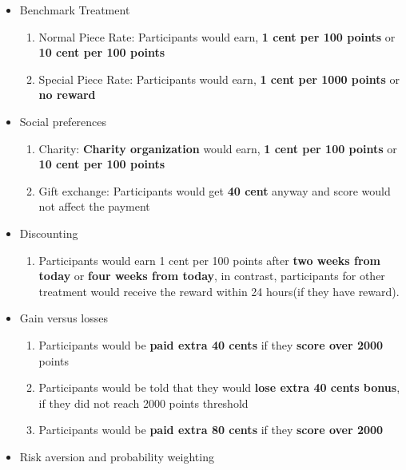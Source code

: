 \documentclass[11pt
]{article}
\begin{document}
\begin{itemize}
\item
  Benchmark Treatment

  \begin{enumerate}
  \def\labelenumi{\arabic{enumi}.}
  \item
    Normal Piece Rate: Participants would earn, \textbf{1 cent per 100
    points} or \textbf{10 cent per 100 points}
  \item
    Special Piece Rate: Participants would earn, \textbf{1 cent per 1000
    points} or \textbf{no reward}
  \end{enumerate}
\item
  Social preferences

  \begin{enumerate}
  \def\labelenumi{\arabic{enumi}.}
  \item
    Charity: \textbf{Charity organization} would earn, \textbf{1 cent
    per 100 points} or \textbf{10 cent per 100 points}
  \item
    Gift exchange: Participants would get \textbf{40 cent} anyway and
    score would not affect the payment
  \end{enumerate}
\item
  Discounting

  \begin{enumerate}
  \def\labelenumi{\arabic{enumi}.}
  \item
    Participants would earn 1 cent per 100 points after \textbf{two weeks
    from today} or \textbf{four weeks from today}, in contrast,
    participants for other treatment would receive the reward within 24
    hours(if they have reward).
  \end{enumerate}
\item
  Gain versus losses

  \begin{enumerate}
  \def\labelenumi{\arabic{enumi}.}
  \item
    Participants would be \textbf{paid extra 40 cents} if they
    \textbf{score over 2000} points
  \item
    Participants would be told that they would \textbf{lose extra 40
    cents bonus}, if they did not reach 2000 points threshold
  \item
    Participants would be \textbf{paid extra 80 cents} if they
    \textbf{score over 2000}
  \end{enumerate}
\item
  Risk aversion and probability weighting


\end{itemize}
\end{document}

